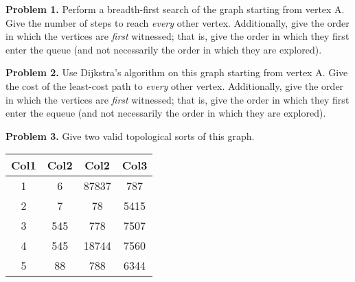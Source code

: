 \documentclass{article}
\begin{document}

\vspace*{5mm}\par\textbf{Problem 1.} Perform a breadth-first search of the graph starting from vertex A.  Give the number of steps to reach \emph{every} other vertex.  Additionally, give the order in which the vertices are \emph{first} witnessed; that is, give the order in which they first enter the queue (and not necessarily the order in which they are explored).\par


\vspace*{10mm}\par\textbf{Problem 2.} Use Dijkstra's algorithm on this graph starting from vertex A.  Give the cost of the least-cost path to \emph{every} other vertex.  Additionally, give the order in which the vertices are \emph{first} witnessed; that is, give the order in which they first enter the equeue (and not necessarily the order in which they are explored).\par


\vspace*{10mm}\par\textbf{Problem 3.} Give two valid topological sorts of this graph.\par

\begin{center}
    \begin{tabular}{||c c c c||} 
     \hline
     Col1 & Col2 & Col2 & Col3 \\ [0.5ex] 
     \hline\hline
     1 & 6 & 87837 & 787 \\ 
     \hline
     2 & 7 & 78 & 5415 \\
     \hline
     3 & 545 & 778 & 7507 \\
     \hline
     4 & 545 & 18744 & 7560 \\
     \hline
     5 & 88 & 788 & 6344 \\ [1ex] 
     \hline
    \end{tabular}
\end{center}

\end{document}
